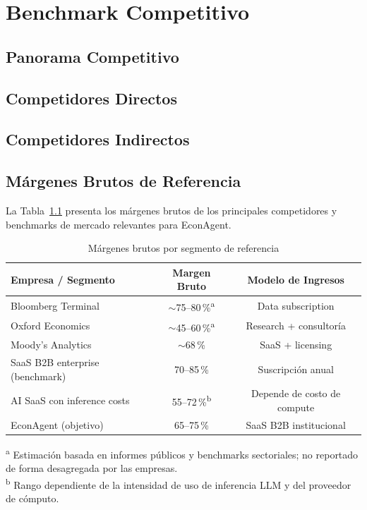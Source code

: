 
\chapter{Benchmark Competitivo}
\label{chap:benchmark-competitivo}

\section{Panorama Competitivo}
\label{sec:panorama-competitivo}

\section{Competidores Directos}
\label{sec:competidores-directos}

\section{Competidores Indirectos}
\label{sec:competidores-indirectos}

\section{Márgenes Brutos de Referencia}
\label{sec:margenes-referencia}

La Tabla~\ref{tab:margenes-brutos} presenta los márgenes brutos de los principales
competidores y benchmarks de mercado relevantes para EconAgent.

\begin{table}[h]
\centering
\caption{Márgenes brutos por segmento de referencia}
\label{tab:margenes-brutos}
\begin{tabular}{lcc}
\toprule
Empresa / Segmento & Margen Bruto & Modelo de Ingresos \\
\midrule
Bloomberg Terminal        & $\sim$75--80\,\%\textsuperscript{a} & Data subscription \\
Oxford Economics          & $\sim$45--60\,\%\textsuperscript{a} & Research + consultoría \\
Moody's Analytics         & $\sim$68\,\% \citep{MoodysAR2023}   & SaaS + licensing \\
SaaS B2B enterprise (benchmark) & 70--85\,\% \citep{SaaSCapitalBenchmark2023} & Suscripción anual \\
AI SaaS con inference costs & 55--72\,\%\textsuperscript{b}     & Depende de costo de compute \\
EconAgent (objetivo)      & 65--75\,\%                          & SaaS B2B institucional \\
\bottomrule
\end{tabular}
\begin{minipage}{\textwidth}
\smallskip\small
\textsuperscript{a} Estimación basada en informes públicos y benchmarks sectoriales;
no reportado de forma desagregada por las empresas.\\
\textsuperscript{b} Rango dependiente de la intensidad de uso de inferencia LLM
y del proveedor de cómputo.
\end{minipage}
\end{table}

